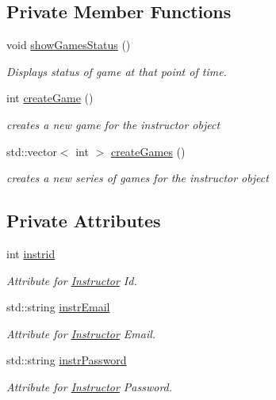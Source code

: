 \subsection*{Private Member Functions}
\begin{DoxyCompactItemize}
\item 
void \hyperlink{class_instructor_a94f9564009326b43a3029fd3419e467b}{show\+Games\+Status} ()
\begin{DoxyCompactList}\small\item\em Displays status of game at that point of time. \end{DoxyCompactList}\item 
int \hyperlink{class_instructor_a9fca4b1272f062d14ffb5bb89b10b6f8}{create\+Game} ()
\begin{DoxyCompactList}\small\item\em creates a new game for the instructor object \end{DoxyCompactList}\item 
std\+::vector$<$ int $>$ \hyperlink{class_instructor_a8d3fa7d2c4cb8268d43db1bb8ecc56f9}{create\+Games} ()
\begin{DoxyCompactList}\small\item\em creates a new series of games for the instructor object \end{DoxyCompactList}\end{DoxyCompactItemize}
\subsection*{Private Attributes}
\begin{DoxyCompactItemize}
\item 
int \hyperlink{class_instructor_a4dde1d72f984b0530250cde154c66d96}{instrid}
\begin{DoxyCompactList}\small\item\em Attribute for \hyperlink{class_instructor}{Instructor} Id. \end{DoxyCompactList}\item 
std\+::string \hyperlink{class_instructor_aa32f70770889ea70fd9e37b176b3d35a}{instr\+Email}
\begin{DoxyCompactList}\small\item\em Attribute for \hyperlink{class_instructor}{Instructor} Email. \end{DoxyCompactList}\item 
std\+::string \hyperlink{class_instructor_aa2550f7fbea278158c928f86c7fc420f}{instr\+Password}
\begin{DoxyCompactList}\small\item\em Attribute for \hyperlink{class_instructor}{Instructor} Password. \end{DoxyCompactList}\end{DoxyCompactItemize}


